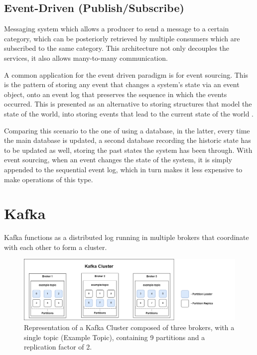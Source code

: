 \subsection{Event-Driven (Publish/Subscribe)}

Messaging system which allows a producer to send a message to a certain category,
which can be posteriorly retrieved by multiple consumers which are subscribed to
the same category. This architecture not only decouples the services, it also
allows many-to-many communication.

A common application for the event driven paradigm is for event sourcing. This
is the pattern of storing any event that changes a system's state via an event
object, onto an event log that preserves the sequence in which the events
occurred. This is presented as an alternative to storing structures that model
the state of the world, into storing events that lead to the current state of
the world \cite[Chapter~5]{nadareishvili2016microservice}.

Comparing this scenario to the one of using a database, in the latter, every
time the main database is updated, a second database recording the historic
state has to be updated as well, storing the past states the system has been
through. With event sourcing, when an event changes the state of the system, it
is simply appended to the sequential event log, which in turn makes it less
expensive to make operations of this type.

\section{Kafka}

Kafka functions as a distributed log running in multiple brokers that coordinate
with each other to form a cluster.

\begin{figure}[H] 
    \centering
    \includegraphics[width=\textwidth]{images/infrastructure/Kafka Cluster.png}
    \caption{
        Representation of a Kafka Cluster composed of three brokers, with a
        single topic (Example Topic), containing 9 partitions and a
        replication factor of 2.
    } 
    \label{fig:kafka_cluster} 
\end{figure}

